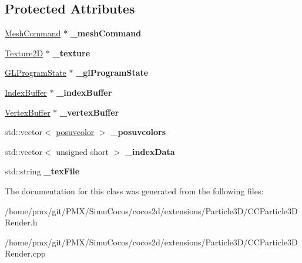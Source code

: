 \subsection*{Protected Attributes}
\begin{DoxyCompactItemize}
\item 
\mbox{\label{classParticle3DQuadRender_aef8ed3ed6fb627981a6d681f634407a8}} 
\hyperlink{classMeshCommand}{Mesh\+Command} $\ast$ {\bfseries \+\_\+mesh\+Command}
\item 
\mbox{\label{classParticle3DQuadRender_ae45205836708ca36c9b1b73f15a7ce1e}} 
\hyperlink{classTexture2D}{Texture2D} $\ast$ {\bfseries \+\_\+texture}
\item 
\mbox{\label{classParticle3DQuadRender_a794b2b4497d0b82648f1f207c8ee1fa5}} 
\hyperlink{classGLProgramState}{G\+L\+Program\+State} $\ast$ {\bfseries \+\_\+gl\+Program\+State}
\item 
\mbox{\label{classParticle3DQuadRender_a4f47bcb09a7aa5a04f4f95466d7eeb88}} 
\hyperlink{classIndexBuffer}{Index\+Buffer} $\ast$ {\bfseries \+\_\+index\+Buffer}
\item 
\mbox{\label{classParticle3DQuadRender_a3e1af44a15d35aac41c5027c028e6264}} 
\hyperlink{classVertexBuffer}{Vertex\+Buffer} $\ast$ {\bfseries \+\_\+vertex\+Buffer}
\item 
\mbox{\label{classParticle3DQuadRender_aea5cf2eea9748b8dcebffb309343dced}} 
std\+::vector$<$ \hyperlink{structParticle3DQuadRender_1_1posuvcolor}{posuvcolor} $>$ {\bfseries \+\_\+posuvcolors}
\item 
\mbox{\label{classParticle3DQuadRender_a00a77ba824900969b15bf7b35f3c43bd}} 
std\+::vector$<$ unsigned short $>$ {\bfseries \+\_\+index\+Data}
\item 
\mbox{\label{classParticle3DQuadRender_ad1c3994360b993a80f7ef4bca7f9aeef}} 
std\+::string {\bfseries \+\_\+tex\+File}
\end{DoxyCompactItemize}


The documentation for this class was generated from the following files\+:\begin{DoxyCompactItemize}
\item 
/home/pmx/git/\+P\+M\+X/\+Simu\+Cocos/cocos2d/extensions/\+Particle3\+D/C\+C\+Particle3\+D\+Render.\+h\item 
/home/pmx/git/\+P\+M\+X/\+Simu\+Cocos/cocos2d/extensions/\+Particle3\+D/C\+C\+Particle3\+D\+Render.\+cpp\end{DoxyCompactItemize}
